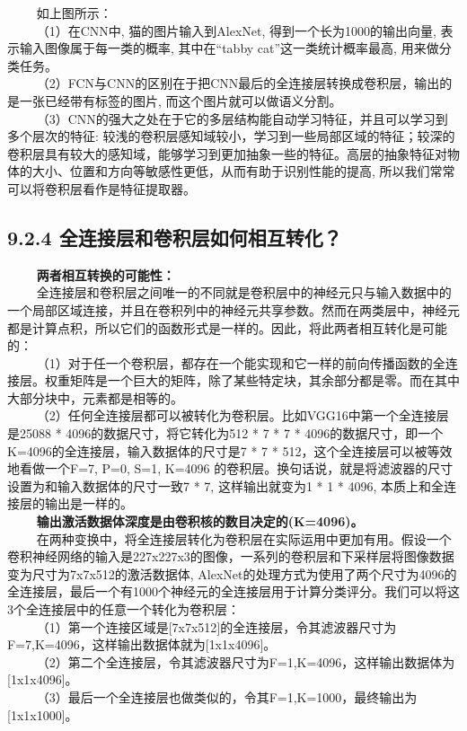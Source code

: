 \begin{figure}
\centering
\end{figure}

   如上图所示：\\
   （1）在CNN中, 猫的图片输入到AlexNet, 得到一个长为1000的输出向量,
表示输入图像属于每一类的概率, 其中在``tabby cat''这一类统计概率最高,
用来做分类任务。\\
  
（2）FCN与CNN的区别在于把CNN最后的全连接层转换成卷积层，输出的是一张已经带有标签的图片,
而这个图片就可以做语义分割。\\
  
（3）CNN的强大之处在于它的多层结构能自动学习特征，并且可以学习到多个层次的特征:
较浅的卷积层感知域较小，学习到一些局部区域的特征；较深的卷积层具有较大的感知域，能够学习到更加抽象一些的特征。高层的抽象特征对物体的大小、位置和方向等敏感性更低，从而有助于识别性能的提高,
所以我们常常可以将卷积层看作是特征提取器。

\subsection{9.2.4
全连接层和卷积层如何相互转化？}\label{ux5168ux8fdeux63a5ux5c42ux548cux5377ux79efux5c42ux5982ux4f55ux76f8ux4e92ux8f6cux5316}

   \textbf{两者相互转换的可能性：}\\
  
全连接层和卷积层之间唯一的不同就是卷积层中的神经元只与输入数据中的一个局部区域连接，并且在卷积列中的神经元共享参数。然而在两类层中，神经元都是计算点积，所以它们的函数形式是一样的。因此，将此两者相互转化是可能的：\\
  
（1）对于任一个卷积层，都存在一个能实现和它一样的前向传播函数的全连接层。权重矩阵是一个巨大的矩阵，除了某些特定块，其余部分都是零。而在其中大部分块中，元素都是相等的。\\
  
（2）任何全连接层都可以被转化为卷积层。比如VGG16中第一个全连接层是25088
* 4096的数据尺寸，将它转化为512 * 7 * 7 *
4096的数据尺寸，即一个K=4096的全连接层，输入数据体的尺寸是7 * 7 *
512，这个全连接层可以被等效地看做一个F=7, P=0, S=1, K=4096
的卷积层。换句话说，就是将滤波器的尺寸设置为和输入数据体的尺寸一致7 * 7,
这样输出就变为1 * 1 * 4096, 本质上和全连接层的输出是一样的。\\
   \textbf{输出激活数据体深度是由卷积核的数目决定的(K=4096)。}\\
  
在两种变换中，将全连接层转化为卷积层在实际运用中更加有用。假设一个卷积神经网络的输入是227x227x3的图像，一系列的卷积层和下采样层将图像数据变为尺寸为7x7x512的激活数据体,
AlexNet的处理方式为使用了两个尺寸为4096的全连接层，最后一个有1000个神经元的全连接层用于计算分类评分。我们可以将这3个全连接层中的任意一个转化为卷积层：\\
  
（1）第一个连接区域是{[}7x7x512{]}的全连接层，令其滤波器尺寸为F=7,K=4096，这样输出数据体就为{[}1x1x4096{]}。\\
  
（2）第二个全连接层，令其滤波器尺寸为F=1,K=4096，这样输出数据体为{[}1x1x4096{]}。\\
  
（3）最后一个全连接层也做类似的，令其F=1,K=1000，最终输出为{[}1x1x1000{]}。

